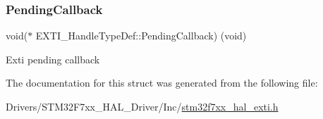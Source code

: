 \subsubsection{\texorpdfstring{PendingCallback}{PendingCallback}}
{\footnotesize\ttfamily void($\ast$  E\+X\+T\+I\+\_\+\+Handle\+Type\+Def\+::\+Pending\+Callback) (void)}

Exti pending callback 

The documentation for this struct was generated from the following file\+:\begin{DoxyCompactItemize}
\item 
Drivers/\+S\+T\+M32\+F7xx\+\_\+\+H\+A\+L\+\_\+\+Driver/\+Inc/\mbox{\hyperlink{stm32f7xx__hal__exti_8h}{stm32f7xx\+\_\+hal\+\_\+exti.\+h}}\end{DoxyCompactItemize}

